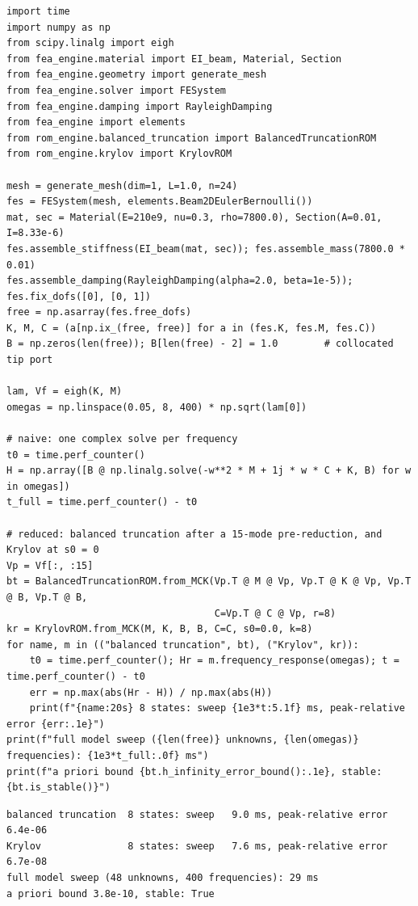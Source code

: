 \begin{lstlisting}[caption={The naive frequency loop against two reduced models of the tip port (run from the repository root with both packages on the path).},label={lst:bt-try}]
import time
import numpy as np
from scipy.linalg import eigh
from fea_engine.material import EI_beam, Material, Section
from fea_engine.geometry import generate_mesh
from fea_engine.solver import FESystem
from fea_engine.damping import RayleighDamping
from fea_engine import elements
from rom_engine.balanced_truncation import BalancedTruncationROM
from rom_engine.krylov import KrylovROM

mesh = generate_mesh(dim=1, L=1.0, n=24)
fes = FESystem(mesh, elements.Beam2DEulerBernoulli())
mat, sec = Material(E=210e9, nu=0.3, rho=7800.0), Section(A=0.01, I=8.33e-6)
fes.assemble_stiffness(EI_beam(mat, sec)); fes.assemble_mass(7800.0 * 0.01)
fes.assemble_damping(RayleighDamping(alpha=2.0, beta=1e-5)); fes.fix_dofs([0], [0, 1])
free = np.asarray(fes.free_dofs)
K, M, C = (a[np.ix_(free, free)] for a in (fes.K, fes.M, fes.C))
B = np.zeros(len(free)); B[len(free) - 2] = 1.0        # collocated tip port

lam, Vf = eigh(K, M)
omegas = np.linspace(0.05, 8, 400) * np.sqrt(lam[0])

# naive: one complex solve per frequency
t0 = time.perf_counter()
H = np.array([B @ np.linalg.solve(-w**2 * M + 1j * w * C + K, B) for w in omegas])
t_full = time.perf_counter() - t0

# reduced: balanced truncation after a 15-mode pre-reduction, and Krylov at s0 = 0
Vp = Vf[:, :15]
bt = BalancedTruncationROM.from_MCK(Vp.T @ M @ Vp, Vp.T @ K @ Vp, Vp.T @ B, Vp.T @ B,
                                    C=Vp.T @ C @ Vp, r=8)
kr = KrylovROM.from_MCK(M, K, B, B, C=C, s0=0.0, k=8)
for name, m in (("balanced truncation", bt), ("Krylov", kr)):
    t0 = time.perf_counter(); Hr = m.frequency_response(omegas); t = time.perf_counter() - t0
    err = np.max(abs(Hr - H)) / np.max(abs(H))
    print(f"{name:20s} 8 states: sweep {1e3*t:5.1f} ms, peak-relative error {err:.1e}")
print(f"full model sweep ({len(free)} unknowns, {len(omegas)} frequencies): {1e3*t_full:.0f} ms")
print(f"a priori bound {bt.h_infinity_error_bound():.1e}, stable: {bt.is_stable()}")
\end{lstlisting}

\begin{lstlisting}[numbers=none,language={},keywordstyle={},commentstyle={},frame=single,aboveskip=2pt]
balanced truncation  8 states: sweep   9.0 ms, peak-relative error 6.4e-06
Krylov               8 states: sweep   7.6 ms, peak-relative error 6.7e-08
full model sweep (48 unknowns, 400 frequencies): 29 ms
a priori bound 3.8e-10, stable: True
\end{lstlisting}

